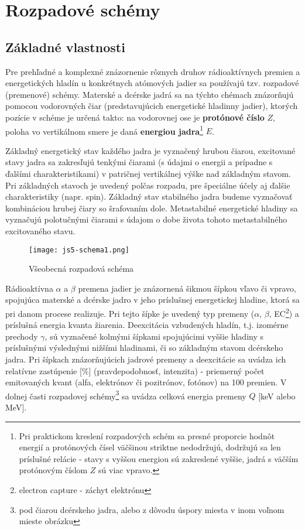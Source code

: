 \documentclass[../../main.tex]{subfiles}
\begin{document}
\chapter{Rozpadové schémy}

\section{Základné vlastnosti}

Pre prehľadné a komplexné znázornenie rôznych druhov rádioaktívnych premien a energetických hladín u konkrétnych atómových jadier sa používajú tzv. rozpadové (premenové) schémy. Materské a dcérske jadrá sa na týchto chémach znázorňujú pomocou vodorovných čiar (predstavujúcich energetické hladinny jadier), ktorých pozície v schéme je určená takto: na vodorovnej ose je \textbf{protónové číslo} $Z$, poloha vo vertikálnom smere je daná \textbf{energiou jadra}\footnote{Pri praktickom kreslení rozpadových schém sa presné proporcie hodnôt energií a protónových čísel väčšinou striktne nedodržujú, dodržujú sa len príslušné relácie - stavy s vyššou energiou sú zakreslené vyššie, jadrá s väčším protónovým číslom $Z$ sú viac vpravo.} $E$. 

Základný energetický stav každého jadra je vyznačený hrubou čiarou, excitované stavy jadra sa zakresľujú tenkými čiarami (s údajmi o energii a prípadne s ďalšími charakteristikami) v patričnej vertikálnej výške nad základným stavom. Pri základných stavoch je uvedený polčas rozpadu, pre špeciálne účely aj ďalšie charakteristiky (napr. spin). Základný stav stabilného jadra budeme vyznačovať kombináciou hrubej čiary so šrafovaním dole. Metastabilné energetické hladiny sa vyznačujú polotučnými čiarami s údajom o dobe života tohoto metastabilného excitovaného stavu.

\begin{figure}[h]
\centering
\texttt{[image: js5-schema1.png]}
\caption{Všeobecná rozpadová schéma}
\label{js5:img:schema1}
\end{figure}

Rádioaktívna $\alpha$ a $\beta$ premena jadier je znázornená šikmou šípkou vľavo či vpravo, spojujúca materské a dcérske jadro v jeho príslušnej energetickej hladine, ktorá sa pri danom procese realizuje. Pri tejto šípke je uvedený typ premeny ($\alpha$, $\beta$, EC\footnote{electron capture - záchyt elektrónu}) a príslušná energia kvanta žiarenia. Deexcitácia vzbudených hladín, t.j. izomérne prechody $\gamma$, sú vyznačené kolmými šípkami spojujúcimi vyššie hladiny s príslušnými výslednými nižšími hladinami, či so základným stavom dcérskeho jadra. Pri šípkach znázorňujúcich jadrové premeny a deexcitácie sa uvádza ich relatívne zastúpenie [$\%$] (pravdepodobnosť, intenzita) - priemerný počet emitovaných kvant (alfa, elektrónov či pozitrónov, fotónov) na 100 premien. V dolnej časti rozpadovej schémy\footnote{pod čiarou dcérskeho jadra, alebo z dôvodu úspory miesta v inom voľnom mieste obrázku} sa uvádza celková energia premeny $Q$ [keV alebo MeV].
\end{document}
